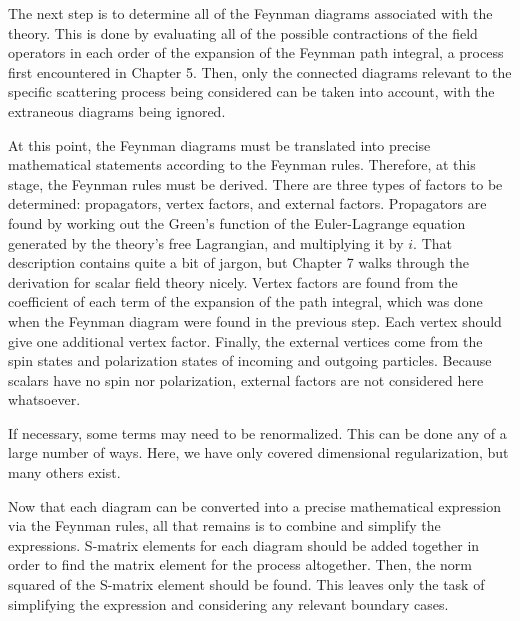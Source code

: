 \documentclass{report}
\begin{document}
The next step is to determine all of the Feynman diagrams associated with the theory. This is done by evaluating all of the possible contractions of the field operators in each order of the expansion of the Feynman path integral, a process first encountered in Chapter 5. Then, only the connected diagrams relevant to the specific scattering process being considered can be taken into account, with the extraneous diagrams being ignored.

At this point, the Feynman diagrams must be translated into precise mathematical statements according to the Feynman rules. Therefore, at this stage, the Feynman rules must be derived. There are three types of factors to be determined: propagators, vertex factors, and external factors. Propagators are found by working out the Green's function of the Euler-Lagrange equation generated by the theory's free Lagrangian, and multiplying it by $i$. That description contains quite a bit of jargon, but Chapter 7 walks through the derivation for scalar field theory nicely. Vertex factors are found from the coefficient of each term of the expansion of the path integral, which was done when the Feynman diagram were found in the previous step. Each vertex should give one additional vertex factor. Finally, the external vertices come from the spin states and polarization states of incoming and outgoing particles. Because scalars have no spin nor polarization, external factors are not considered here whatsoever.

If necessary, some terms may need to be renormalized. This can be done any of a large number of ways. Here, we have only covered dimensional regularization, but many others exist.

Now that each diagram can be converted into a precise mathematical expression via the Feynman rules, all that remains is to combine and simplify the expressions. S-matrix elements for each diagram should be added together in order to find the matrix element for the process altogether. Then, the norm squared of the S-matrix element should be found. This leaves only the task of simplifying the expression and considering any relevant boundary cases.
\end{document}
